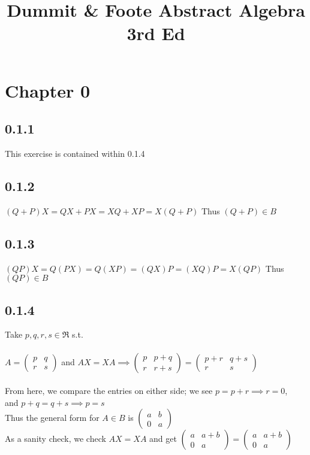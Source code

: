 \documentclass[11pt]{article}
\begin{document}
\title{Dummit \& Foote Abstract Algebra 3rd Ed}

\maketitle
\clearpage

\section*{Chapter 0}
	\subsection*{0.1.1}
		This exercise is contained within 0.1.4
	
	\subsection*{0.1.2}
		$(Q + P)X = QX + PX = XQ + XP = X(Q + P)$ Thus $(Q + P) \in B$
	\subsection*{0.1.3}
		$(QP)X = Q(PX) = Q(XP) = (QX)P = (XQ)P = X(QP)$ Thus $(QP) \in B$
	\subsection*{0.1.4}
		Take $p,q,r,s \in \Re$ s.t.\\
		\\
		$
		A = \begin{pmatrix}
			p & q \\
			r & s
		\end{pmatrix}
		$ and $
		AX = XA \implies
		\begin{pmatrix}
			p & p+q \\
			r & r+s
		\end{pmatrix} =
		\begin{pmatrix}
			p+r & q+s \\
			r & s
		\end{pmatrix}
		$\\
		\\
		From here, we compare the entries on either side; we see $p = p+r \implies r = 0$,\\ and $p+q=q+s \implies p=s$\\
		Thus the general form for $A \in B$ is $
		\begin{pmatrix}
			a & b \\
			0 & a
		\end{pmatrix}
		$\\
		As a sanity check, we check $AX = XA$ and get $
		\begin{pmatrix}
			a & a+b\\
			0 & a
		\end{pmatrix} = 
		\begin{pmatrix}
			a & a+b \\
			0 & a
		\end{pmatrix}
		$
\end{document}
